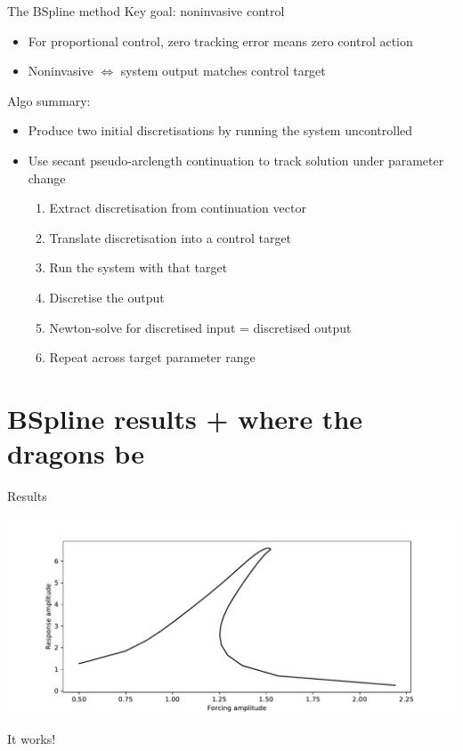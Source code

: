 \documentclass[presentation]{beamer}
\begin{document}
\begin{frame}[label={sec:orgc01ad02}]{The BSpline method}
Key goal: noninvasive control
\begin{itemize}
\item For proportional control, zero tracking error means zero control action
\item Noninvasive \(\iff\) system output matches control target
\end{itemize}
\vfill
Algo summary:
\begin{itemize}[<+->]
\item Produce two initial discretisations by running the system uncontrolled
\item Use secant pseudo-arclength continuation to track solution under parameter change
\begin{enumerate}
\item Extract discretisation from continuation vector
\item Translate discretisation into a control target
\item Run the system with that target
\item Discretise the output
\item Newton-solve for discretised input = discretised output
\item Repeat across target parameter range
\end{enumerate}
\end{itemize}
\end{frame}

\section{BSpline results + where the dragons be}
\label{sec:org7fabf48}

\begin{frame}[label={sec:org8179fb4}]{Results}
\begin{center}
\includegraphics[width=.9\linewidth]{./success.pdf}
\end{center}

It works!
\end{frame}
\end{document}

